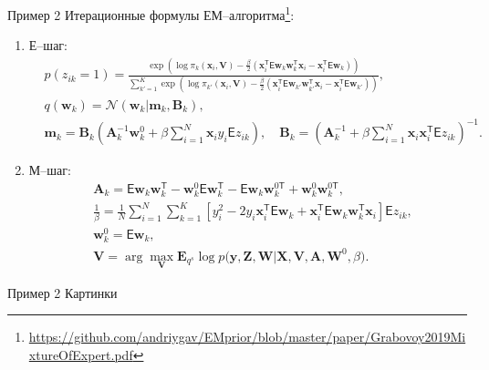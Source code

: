 \documentclass[9pt,pdf,hyperref={unicode}]{beamer}
\begin{document}
\begin{frame}{Пример 2}
\justifying
Итерационные формулы ЕМ--алгоритма\footnote{\url{https://github.com/andriygav/EMprior/blob/master/paper/Grabovoy2019MixtureOfExpert.pdf}}:
	\begin{enumerate}
		\item Е--шаг: 
			\begin{equation}
			\label{sl:4:eq:1}
				\begin{aligned}
					&p\left(z_{ik} = 1\right) = \frac{\exp\left(\log\pi_{k}\left(\textbf{x}_{i}, \textbf{V}\right) - \frac{\beta}{2}\left(\textbf{x}_{i}^{\mathsf{T}}\mathsf{E}\textbf{w}_{k}\textbf{w}_{k}^{\mathsf{T}}\textbf{x}_{i} - \textbf{x}_{i}^{\mathsf{T}}\mathsf{E}\textbf{w}_{k}\right)\right)}{\sum_{k'=1}^{K}\exp\left(\log\pi_{k'}\left(\textbf{x}_{i}, \textbf{V}\right) - \frac{\beta}{2}\left(\textbf{x}_{i}^{\mathsf{T}}\mathsf{E}\textbf{w}_{k'}\textbf{w}_{k'}^{\mathsf{T}}\textbf{x}_{i} - \textbf{x}_{i}^{\mathsf{T}}\mathsf{E}\textbf{w}_{k'}\right) \right)},\\
					&q(\textbf{w}_k) = \mathcal{N}(\textbf{w}_k|\textbf{m}_k, \textbf{B}_k),\\
					&\mathbf{m}_{k} = \mathbf{B}_{k}\left(\mathbf{A}_{k}^{-1}\mathbf{w}_{k}^{0}+\beta\sum_{i=1}^{N}\mathbf{x}_{i}y_{i}\mathsf{E}z_{ik}\right), \quad
					\mathbf{B}_{k} = \left(\mathbf{A}_{k}^{-1}+\beta\sum_{i=1}^{N}\mathbf{x}_{i}\mathbf{x}_{i}^{\mathsf{T}}\mathsf{E}z_{ik}\right)^{-1} .
				\end{aligned}
			\end{equation}
		\item М--шаг: 
			\begin{equation}
			\label{sl:4:eq:2}
				\begin{aligned}
					&\textbf{A}_{k} = \mathsf{E}\textbf{w}_{k}\textbf{w}_{k}^{\mathsf{T}} - \textbf{w}_{k}^{0}\mathsf{E}\textbf{w}_{k}^{\mathsf{T}} - \mathsf{E}\textbf{w}_{k}\textbf{w}_{k}^{0\mathsf{T}} + \textbf{w}_{k}^{0}\textbf{w}_{k}^{0\mathsf{T}}, \\
					 &\frac{1}{\beta}=\frac{1}{N}\sum_{i=1}^{N}\sum_{k=1}^{K}\left[y_{i}^{2}-2y_{i}\textbf{x}_{i}^{\mathsf{T}}\mathsf{E}\textbf{w}_{k} + \textbf{x}_{i}^{\mathsf{T}}\mathsf{E}\textbf{w}_{k}\textbf{w}_{k}^{\mathsf{T}}\textbf{x}_{i}\right]\mathsf{E}z_{ik},\\
					&\textbf{w}_{k}^{0} =\mathsf{E}\textbf{w}_{k},\\
					&\textbf{V}= \arg\max_{\textbf{V}} \mathbf{E}_{q^{s}}\log p\bigr(\mathbf{y}, \textbf{Z},\mathbf{W}|\mathbf{X}, \mathbf{V}, \textbf{A}, \textbf{W}^{0}, \beta\bigr).
				\end{aligned}
			\end{equation}
	\end{enumerate}
\end{frame}
\begin{frame}{Пример 2}
\justifying
Картинки
\end{frame}
\end{document}
